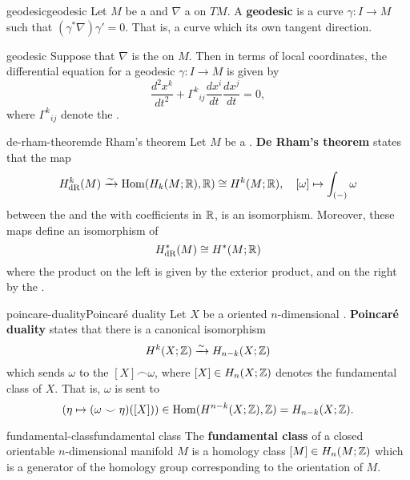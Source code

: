 \begin{topic}{geodesic}{geodesic}
    Let $M$ be a  and $\nabla$ a  on $TM$. A \textbf{geodesic} is a curve $\gamma : I \to M$ such that $(\gamma^* \nabla) \gamma' = 0$. That is, a curve which  its own tangent direction.
\end{topic}

\begin{example}{geodesic}
    Suppose that $\nabla$ is the  on $M$. Then in terms of local coordinates, the differential equation for a geodesic $\gamma : I \to M$ is given by
    \[ \frac{d^2 x^k}{d t^2} + {\Gamma^k}_{ij} \frac{dx^i}{dt} \frac{dx^j}{dt} = 0 , \]
    where ${\Gamma^k}_{ij}$ denote the .
\end{example}

\begin{topic}{de-rham-theorem}{de Rham's theorem}
    Let $M$ be a . \textbf{De Rham's theorem} states that the map
    \[ H_{\textup{dR}}^k(M) \xrightarrow{\sim} \operatorname{Hom}(H_k(M; \mathbb{R}), \mathbb{R}) \cong H^k(M; \mathbb{R}), \quad [ \omega ] \mapsto \int_{(-)} \omega \]
    between the  and the  with coefficients in $\mathbb{R}$, is an isomorphism. Moreover, these maps define an isomorphism of 
    \[ H_{\textup{dR}}^*(M) \cong H^*(M; \mathbb{R}) \]
    where the product on the left is given by the exterior product, and on the right by the .
\end{topic}

\begin{topic}{poincare-duality}{Poincaré duality}
    Let $X$ be a  oriented $n$-dimensional . \textbf{Poincaré duality} states that there is a canonical isomorphism
    \[ H^k(X; \mathbb{Z}) \xrightarrow{\sim} H_{n - k}(X; \mathbb{Z}) \]
    which sends $\omega$ to the  $[X] \frown \omega$, where $[X] \in H_n(X; \mathbb{Z})$ denotes the fundamental class of $X$. That is, $\omega$ is sent to
    \[ (\eta \mapsto (\omega \smile \eta)([X])) \in \operatorname{Hom}(H^{n - k}(X; \mathbb{Z}), \mathbb{Z}) = H_{n - k}(X; \mathbb{Z}) . \]
\end{topic}

\begin{topic}{fundamental-class}{fundamental class}
    The \textbf{fundamental class} of a closed orientable $n$-dimensional manifold $M$ is a homology class $[M] \in H_n(M; \mathbb{Z})$ which is a generator of the homology group corresponding to the orientation of $M$.
\end{topic}

